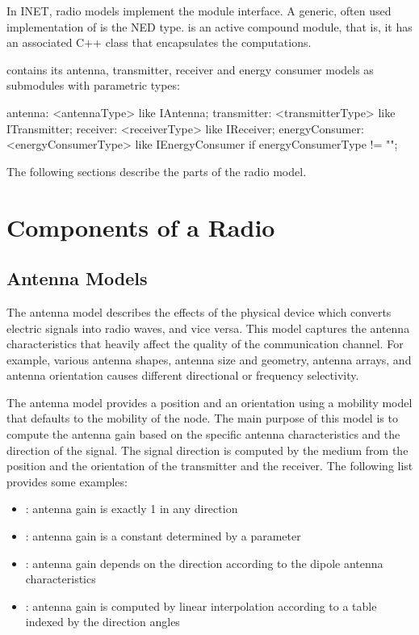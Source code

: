In INET, radio models implement the  module interface.
A generic, often used implementation of  is the
 NED type.  is an active compound module,
that is, it has an associated C++ class that encapsulates the computations.

 contains its antenna, transmitter, receiver and energy
consumer models as submodules with parametric types:

\begin{ned}
antenna: <antennaType> like IAntenna;
transmitter: <transmitterType> like ITransmitter;
receiver: <receiverType> like IReceiver;
energyConsumer: <energyConsumerType> like IEnergyConsumer
    if energyConsumerType != "";
\end{ned}

The following sections describe the parts of the radio model.

\section{Components of a Radio}
\label{sec:phy:components-of-a-radio}

\subsection{Antenna Models}
\label{sec:phy:antenna-models}

The antenna model describes the effects of the physical device which converts
electric signals into radio waves, and vice versa. This model captures the
antenna characteristics that heavily affect the quality of the communication
channel. For example, various antenna shapes, antenna size and geometry, antenna
arrays, and antenna orientation causes different directional or frequency
selectivity.

The antenna model provides a position and an orientation using a mobility model
that defaults to the mobility of the node. The main purpose of this model is to
compute the antenna gain based on the specific antenna characteristics and the
direction of the signal. The signal direction is computed by the medium from the
position and the orientation of the transmitter and the receiver. The following
list provides some examples:

\begin{itemize}
  \item {}: antenna gain is exactly 1 in any direction
  \item {}: antenna gain is a constant determined by
    a parameter
  \item {}: antenna gain depends on the direction according
    to the dipole antenna characteristics
  \item {}: antenna gain is computed by linear
    interpolation according to a table indexed by the direction angles
\end{itemize}

